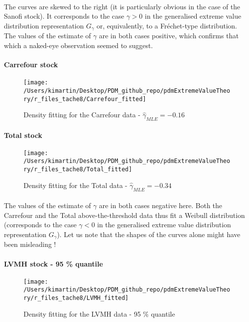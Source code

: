 \paragraph{}
The curves are skewed to the right (it is particularly obvious in the case of the Sanofi stock). It corresponds to the case $\gamma > 0$ in the generalised extreme value distribution representation $G_\gamma$ or, equivalently, to a Fréchet-type distribution. The values of the estimate of $\gamma$ are in both cases positive, which confirms that which a naked-eye observation seemed to suggest.
\clearpage
\paragraph{Carrefour stock }
\begin{figure}[h!]
	\centering
	\texttt{[image: /Users/kimartin/Desktop/PDM\_github\_repo/pdmExtremeValueTheory/r\_files\_tache8/Carrefour\_fitted]}
	\caption{Density fitting for the Carrefour data - $\hat{\gamma}_{MLE} = -0.16$ }
	\label{fig:dataAboveThresholdBNPFitted}
\end{figure}
\paragraph{Total stock}
\begin{figure}[h!]
	\centering
	\texttt{[image: /Users/kimartin/Desktop/PDM\_github\_repo/pdmExtremeValueTheory/r\_files\_tache8/Total\_fitted]}
	\caption{Density fitting for the Total data - $\hat{\gamma}_{MLE} = -0.34$}
	\label{fig:dataAboveThresholdtotalFitted}
\end{figure}
\paragraph{}
 The values of the estimate of $\gamma$ are in both cases negative here. Both the Carrefour and the Total above-the-threshold data thus fit a Weibull distribution (corresponds to the case $\gamma < 0$ in the generalised extreme value distribution representation $G_\gamma$). Let us note that the shapes of the curves alone might have been misleading !
\clearpage
\paragraph{LVMH stock - 95 \% quantile}
\begin{figure}[h!]
	\centering
	\texttt{[image: /Users/kimartin/Desktop/PDM\_github\_repo/pdmExtremeValueTheory/r\_files\_tache8/LVMH\_fitted]}
	\caption{Density fitting for the LVMH data - 95 \% quantile \\}
	\label{fig:dataAboveThresholdLVMHFitted}
\end{figure}
